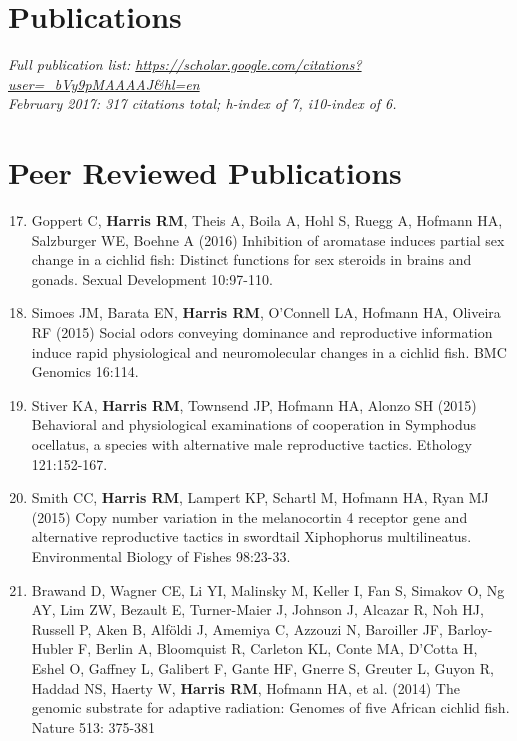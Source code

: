 \documentclass[margin,line]{resume}
\newenvironment{benumerate}[1]{
    \let\oldItem\item
    \def\item{\addtocounter{enumi}{-2}\oldItem}
    \begin{enumerate}
    \setcounter{enumi}{#1}
    \addtocounter{enumi}{1}
}{
    \end{enumerate}
}
\begin{document}
\begin{resume}
    \section{\mysidestyle Publications}

{\em Full publication list: \url{https://scholar.google.com/citations?user=_bVy9pMAAAAJ&hl=en}
\\
  February 2017: 317 citations total; h-index of 7, i10-index of 6.}
 

    \section{\mysidestyle Peer Reviewed Publications}
    
\begin{benumerate}{16}
\setlength{\itemsep}{3pt}
\item Goppert C, {\bf Harris RM}, Theis A, Boila A, Hohl S, Ruegg A, Hofmann HA, Salzburger WE, Boehne A (2016)  Inhibition of aromatase induces partial sex change in a cichlid fish: Distinct functions for sex steroids in brains and gonads. Sexual Development 10:97-110.

\item Simoes JM, Barata EN, {\bf Harris RM}, O'Connell LA, Hofmann HA, Oliveira RF (2015) Social odors conveying dominance and reproductive information induce rapid physiological and neuromolecular changes in a cichlid fish. BMC Genomics 16:114. 

\item Stiver KA, {\bf Harris RM}, Townsend JP, Hofmann HA, Alonzo SH (2015) Behavioral and physiological examinations of cooperation in Symphodus ocellatus, a species with alternative male reproductive tactics. Ethology 121:152-167.

\item Smith CC, {\bf Harris RM}, Lampert KP, Schartl M, Hofmann HA, Ryan MJ (2015) Copy number variation in the melanocortin 4 receptor gene and alternative reproductive tactics in swordtail Xiphophorus multilineatus. Environmental Biology of Fishes 98:23-33.

\item Brawand D, Wagner CE, Li YI, Malinsky M, Keller I, Fan S, Simakov O, Ng AY, Lim ZW, Bezault E, Turner-Maier J, Johnson J, Alcazar R, Noh HJ, Russell P, Aken B, Alföldi J, Amemiya C, Azzouzi N, Baroiller JF, Barloy-Hubler F, Berlin A, Bloomquist R, Carleton KL, Conte MA, D'Cotta H, Eshel O, Gaffney L, Galibert F, Gante HF, Gnerre S, Greuter L, Guyon R, Haddad NS, Haerty W, {\bf Harris RM}, Hofmann HA, et al. (2014) The genomic substrate for adaptive radiation: Genomes of five African cichlid fish. Nature 513: 375-381


\end{benumerate}
\end{resume}
\end{document}
